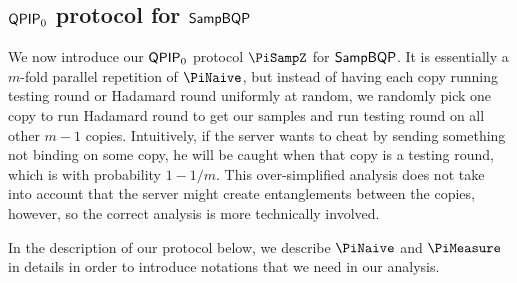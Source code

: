 \subsection{$\operatorname{\mathsf{QPIP}}_0$ protocol for $\operatorname{\mathsf{SampBQP}}$} \label{sec:qpip0}

We now introduce our $\operatorname{\mathsf{QPIP}}_0$ protocol $\PiSampZ$ for $\operatorname{\mathsf{SampBQP}}$.
It is essentially a $m$-fold parallel repetition of $\PiNaive$,
but instead of having each copy running testing round or Hadamard round uniformly at random, we randomly pick one copy to run Hadamard round to get our samples and run testing round on all other $m-1$ copies.
Intuitively, if the server wants to cheat by sending something not binding on some copy,
he will be caught when that copy is a testing round, which is with probability $1-1/m$.
This over-simplified analysis does not take into account that the server might create entanglements between the copies, however, so the correct analysis is more technically involved.

In the description of our protocol below, we describe $\PiNaive$ and $\PiMeasure$ in details in order to introduce notations that we need in our analysis.

